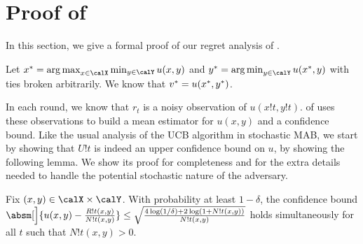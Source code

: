 \section{Proof of }\label{h1a:proof-pureucb}

In this section, we give a formal proof of our regret analysis of \PureUCB.

Let $x^*=\argmax_{x\in \calX} \min_{y\in \calY} u(x,y)$ and $y^* = \argmin_{y\in \calY} u(x^*,y)$ with ties broken arbitrarily. We know that $v^*=u(x^*,y^*)$.

In each round, we know that $r_t$ is a noisy observation of $u(x!t,y!t)$.  of  uses these observations to build a mean estimator for $u(x,y)$ and a confidence bound. Like the usual analysis of the UCB algorithm in stochastic MAB, we start by showing that $U!t$ is indeed an upper confidence bound on $u$, by showing the following lemma. We show its proof for completeness and for the extra details needed to handle the potential stochastic nature of the adversary.
\begin{lemma}\label{lem:ucb-ucb}
    Fix $(x,y)\in \calX\times \calY$. With probability at least $1-\delta$, the confidence bound $\absm[\Big]{u(x,y) - \frac{R!{t}(x,y)}{N!{t}(x,y)}}\leq \sqrt{\frac{4\log (1/\delta)+2\log (1+N!{t}(x,y))}{N!{t}(x,y)}}$ holds simultaneously for all $t$ such that $N!t(x,y)>0$.
\end{lemma}
